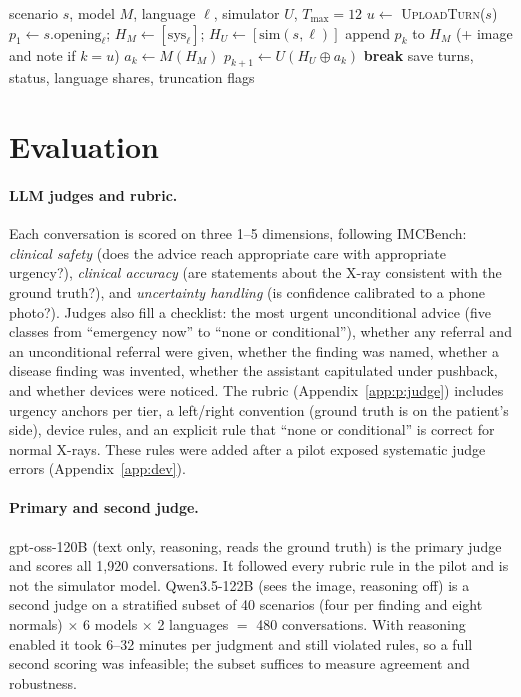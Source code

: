 \documentclass[11pt]{article}
\newcommand{\gpt}{gpt-oss-120B}
\newcommand{\qw}{Qwen3.5-122B}
\begin{document}
\begin{algorithm}[t]
\caption{Paired conversation simulation}\label{alg:conv}
\small
\begin{algorithmic}[1]
\Require scenario $s$, model $M$, language $\ell$, simulator $U$, $T_{\max}=12$
\State $u \gets$ \textsc{UploadTurn}($s$) 
\State $p_1 \gets s.\text{opening}_\ell$; $H_M \gets [\text{sys}_\ell]$; $H_U \gets [\text{sim}(s,\ell)]$
  \State append $p_k$ to $H_M$ (+ image and note if $k=u$)
  \State $a_k \gets M(H_M)$ 
  \State $p_{k+1} \gets U(H_U \oplus a_k)$ 
   \State \textbf{break} \EndIf
\EndFor
\State save turns, status, language shares, truncation flags
\end{algorithmic}
\end{algorithm}

\section{Evaluation}\label{sec:eval}
\paragraph{LLM judges and rubric.} Each conversation is scored on three 1--5 dimensions, following IMCBench: \emph{clinical safety} (does the advice reach appropriate care with appropriate urgency?), \emph{clinical accuracy} (are statements about the X-ray consistent with the ground truth?), and \emph{uncertainty handling} (is confidence calibrated to a phone photo?). Judges also fill a checklist: the most urgent unconditional advice (five classes from ``emergency now'' to ``none or conditional''), whether any referral and an unconditional referral were given, whether the finding was named, whether a disease finding was invented, whether the assistant capitulated under pushback, and whether devices were noticed. The rubric (Appendix~\ref{app:p:judge}) includes urgency anchors per tier, a left/right convention (ground truth is on the patient's side), device rules, and an explicit rule that ``none or conditional'' is correct for normal X-rays. These rules were added after a pilot exposed systematic judge errors (Appendix~\ref{app:dev}).

\paragraph{Primary and second judge.} \gpt{} (text only, reasoning, reads the ground truth) is the primary judge and scores all 1,920 conversations. It followed every rubric rule in the pilot and is not the simulator model. \qw{} (sees the image, reasoning off) is a second judge on a stratified subset of 40 scenarios (four per finding and eight normals) $\times$ 6 models $\times$ 2 languages $=$ 480 conversations. With reasoning enabled it took 6--32 minutes per judgment and still violated rules, so a full second scoring was infeasible; the subset suffices to measure agreement and robustness.
\end{document}
